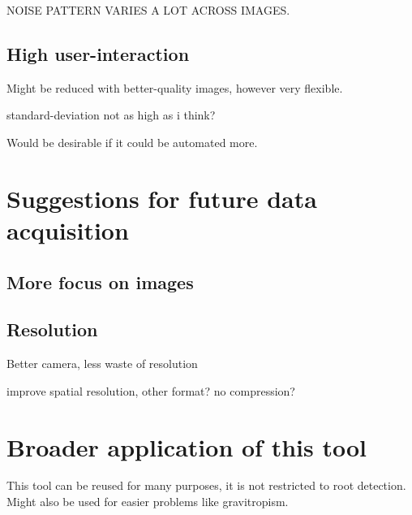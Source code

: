 NOISE PATTERN VARIES A LOT ACROSS IMAGES.

\subsection{High user-interaction}
Might be reduced with better-quality images, however very flexible.


standard-deviation not as high as i think?

Would be desirable if it could be automated more. 

\section{Suggestions for future data acquisition}


\subsection{More focus on images}


\subsection{Resolution}

Better camera, less waste of resolution

improve spatial resolution, other format? no compression?
 
 
\section{Broader application of this tool}

This tool can be reused for many purposes, it is not restricted to root detection.
Might also be used for easier problems like gravitropism.


